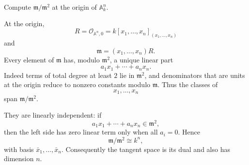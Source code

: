 \begin{problem}\label{prob:vi32-04}
Compute \(\mathfrak m/\mathfrak m^2\) at the origin of \(\mathbb A^n_k\).

\end{problem}

\ifdefined\FullProblemDossiers
\begin{solution}
At the origin,
\[
R=\mathcal O_{\mathbb A^n,0}
=
k[x_1,\ldots,x_n]_{(x_1,\ldots,x_n)}
\]
and
\[
\mathfrak m=(x_1,\ldots,x_n)R.
\]
Every element of \(\mathfrak m\) has, modulo \(\mathfrak m^2\), a unique linear part
\[
a_1x_1+\cdots+a_nx_n.
\]
Indeed terms of total degree at least \(2\) lie in \(\mathfrak m^2\), and denominators that are units at the origin
reduce to nonzero constants modulo \(\mathfrak m\). Thus the classes of
\[
x_1,\ldots,x_n
\]
span \(\mathfrak m/\mathfrak m^2\).

They are linearly independent: if
\[
a_1x_1+\cdots+a_nx_n\in\mathfrak m^2,
\]
then the left side has zero linear term only when all \(a_i=0\). Hence
\[
\boxed{
\mathfrak m/\mathfrak m^2
\cong
k^n,
}
\]
with basis \(\bar x_1,\ldots,\bar x_n\). Consequently the tangent space is its dual and also has dimension \(n\).
\end{solution}
\fi
